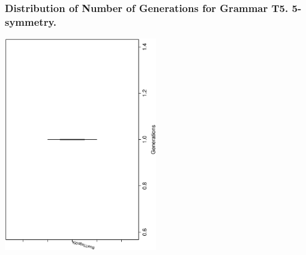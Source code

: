  \begin{frame}
 \frametitle{ Distribution of Number of Generations for Grammar T5. 5-symmetry. }
 \begin{center}
\includegraphics[width=0.5\textwidth, angle=-90]
{ExpFboxplottGenerations003.eps}
 \end{center}
 \label{ExpFboxplottGenerations003.eps}  
 \end{frame}

